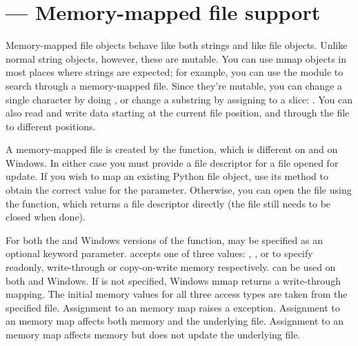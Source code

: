 \section{ ---
Memory-mapped file support}


Memory-mapped file objects behave like both strings and like
file objects.  Unlike normal string objects, however, these are
mutable.  You can use mmap objects in most places where strings
are expected; for example, you can use the  module to
search through a memory-mapped file.  Since they're mutable, you can
change a single character by doing , or
change a substring by assigning to a slice:
.  You can also read and write
data starting at the current file position, and 
through the file to different positions.

A memory-mapped file is created by the  function,
which is different on \UNIX{} and on Windows.  In either case you must
provide a file descriptor for a file opened for update.
If you wish to map an existing Python file object, use its
 method to obtain the correct value for the
 parameter.  Otherwise, you can open the file using the
 function, which returns a file descriptor
directly (the file still needs to be closed when done).

For both the \UNIX{} and Windows versions of the function,
 may be specified as an optional keyword parameter.
 accepts one of three values: ,
, or  to specify
readonly, write-through or copy-on-write memory respectively.
 can be used on both \UNIX{} and Windows.  If
 is not specified, Windows mmap returns a write-through
mapping.  The initial memory values for all three access types are
taken from the specified file.  Assignment to an
 memory map raises a 
exception.  Assignment to an  memory map
affects both memory and the underlying file.  Assignment to an
 memory map affects memory but does not update
the underlying file.  

